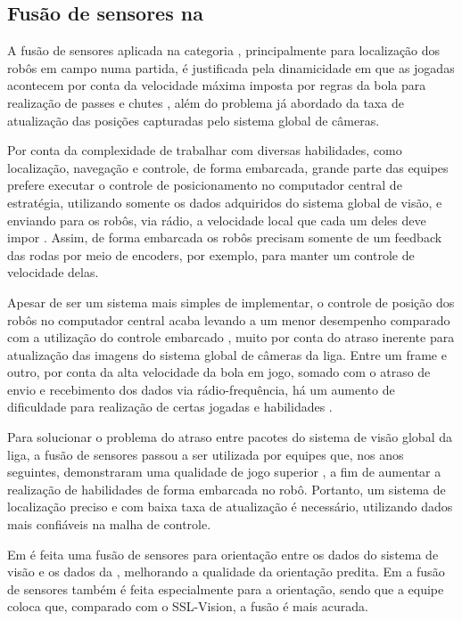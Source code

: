 \documentclass[acronym, symbols, table, deposito]{fei}
\begin{document}
			\subsection{Fusão de sensores na } \label{sec:fusao_sensores_ssl}
			
				A fusão de sensores aplicada na categoria , principalmente para localização dos robôs em campo numa partida, é justificada pela dinamicidade em que as jogadas acontecem por conta da velocidade máxima imposta por regras da bola para realização de passes e chutes \cite{rules}, além do problema já abordado da taxa de atualização das posições capturadas pelo sistema global de câmeras.
				
				Por conta da complexidade de trabalhar com diversas habilidades, como localização, navegação e controle, de forma embarcada, grande parte das equipes prefere executar o controle de posicionamento no computador central de estratégia, utilizando somente os dados adquiridos do sistema global de visão, e enviando para os robôs, via rádio, a velocidade local que cada um deles deve impor \cite{ubc_thunderbots_2015, immortals_2023}. Assim, de forma embarcada os robôs precisam somente de um feedback das rodas por meio de encoders, por exemplo, para manter um controle de velocidade delas.
				
				Apesar de ser um sistema mais simples de implementar, o controle de posição dos robôs no computador central acaba levando a um menor desempenho comparado com a utilização do controle embarcado \cite{ubc_thunderbots_2015}, muito por conta do atraso inerente para atualização das imagens do sistema global de câmeras da liga. Entre um frame e outro, por conta da alta velocidade da bola em jogo, somado com o atraso de envio e recebimento dos dados via rádio-frequência, há um aumento de dificuldade para realização de certas jogadas e habilidades \cite{immortals_2023}.
				
				Para solucionar o problema do atraso entre pacotes do sistema de visão global da liga, a fusão de sensores passou a ser utilizada por equipes que, nos anos seguintes, demonstraram uma qualidade de jogo superior \cite{zjunlict_2018, tigers_2013, ubc_thunderbots_2015, ubc_thunderbots_2017, immortals_2023, parsian_2015}, a fim de aumentar a realização de habilidades de forma embarcada no robô. Portanto, um sistema de localização preciso e com baixa taxa de atualização é necessário, utilizando dados mais confiáveis na malha de controle.
				
				Em \textcite{immortals_2023} é feita uma fusão de sensores para orientação entre os dados do sistema de visão e os dados da , melhorando a qualidade da orientação predita. Em \textcite{parsian_2019} a fusão de sensores também é feita especialmente para a orientação, sendo que a equipe coloca que, comparado com o SSL-Vision, a fusão é mais acurada.
				
\end{document}
